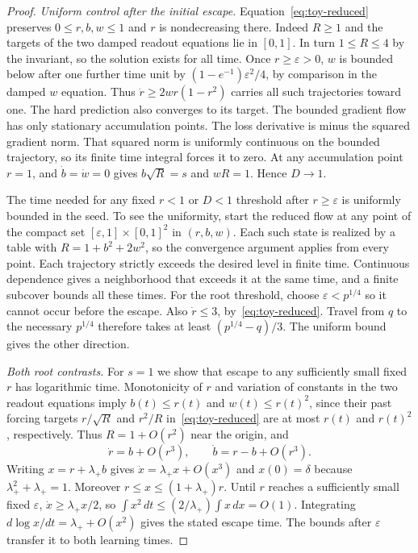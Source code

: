 \begin{proof}
\emph{Uniform control after the initial escape.}
Equation~\eqref{eq:toy-reduced} preserves $0\le r,b,w\le1$ and $r$ is
nondecreasing there. Indeed $R\ge1$ and the targets of the two damped
readout equations lie in $[0,1]$. In turn $1\le R\le4$ by the invariant,
so the solution exists for all time. Once $r\ge\varepsilon>0$,
$w$ is bounded below after one further time unit by
$(1-e^{-1})\varepsilon^2/4$, by comparison in the damped $w$ equation.
Thus $\dot r\ge 2wr(1-r^2)$ carries all such trajectories toward one.
The hard prediction also converges to its target. The bounded gradient
flow has only stationary accumulation points. The loss derivative is
minus the squared gradient norm. That squared norm is uniformly continuous on
the bounded trajectory, so its finite time integral forces it to zero. At any accumulation point $r=1$, and
$\dot b=\dot w=0$ gives $b\sqrt R=s$ and $wR=1$. Hence $D\to1$.

The time needed for any fixed $r<1$ or $D<1$ threshold after
$r\ge\varepsilon$ is uniformly bounded in the seed. To see the uniformity,
start the reduced flow at any point of the compact set
$[\varepsilon,1]\times[0,1]^2$ in $(r,b,w)$. Each such state is realized by
a table with $R=1+b^2+2w^2$, so the convergence argument applies from
every point. Each trajectory strictly exceeds the desired level in
finite time. Continuous dependence gives a neighborhood that exceeds it
at the same time, and a finite subcover bounds all these times.
For the root threshold, choose $\varepsilon<p^{1/4}$ so it cannot occur
before the escape. Also $\dot r\le3$, by~\eqref{eq:toy-reduced}.
Travel from $q$ to the necessary $p^{1/4}$ therefore takes at least
$(p^{1/4}-q)/3$. The uniform bound gives the other direction.

\emph{Both root contrasts.}
For $s=1$ we show that escape to any sufficiently small fixed $r$ has
logarithmic time. Monotonicity of $r$ and variation of constants in
the two readout equations imply $b(t)\le r(t)$ and $w(t)\le r(t)^2$,
since their past forcing targets $r/\sqrt R$ and $r^2/R$ in~\eqref{eq:toy-reduced}
are at most $r(t)$ and $r(t)^2$, respectively. Thus $R=1+O(r^2)$ near the
origin, and
\[
 \dot r=b+O(r^3),\qquad \dot b=r-b+O(r^3).
\]
Writing $x=r+\lambda_+ b$ gives
$\dot x=\lambda_+x+O(x^3)$ and $x(0)=\delta$ because
$\lambda_+^2+\lambda_+=1$. Moreover $r\le x\le(1+\lambda_+)r$.
Until $r$ reaches a sufficiently small fixed $\varepsilon$,
$\dot x\ge\lambda_+x/2$, so
$\int x^2\,dt\le (2/\lambda_+)\int x\,dx=O(1)$.
Integrating $d\log x/dt=\lambda_++O(x^2)$ gives the stated escape time.
The bounds after $\varepsilon$ transfer it to both learning times.


\end{proof}
